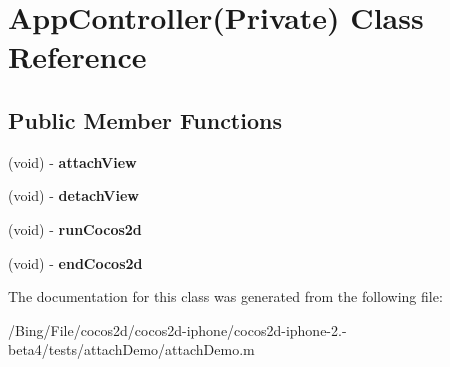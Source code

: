 \hypertarget{interface_app_controller_07_private_08}{\section{App\-Controller(Private) Class Reference}
\label{interface_app_controller_07_private_08}
}
\subsection*{Public Member Functions}
\begin{DoxyCompactItemize}
\item 
\hypertarget{interface_app_controller_07_private_08_af3af8aba92d43780f0247f8ca91202b5}{(void) -\/ {\bfseries attach\-View}}\label{interface_app_controller_07_private_08_af3af8aba92d43780f0247f8ca91202b5}

\item 
\hypertarget{interface_app_controller_07_private_08_a17c3ab8ddbfc3f049a54f18b8e9f3048}{(void) -\/ {\bfseries detach\-View}}\label{interface_app_controller_07_private_08_a17c3ab8ddbfc3f049a54f18b8e9f3048}

\item 
\hypertarget{interface_app_controller_07_private_08_ae37f8246ee9e4e0d3125f302e06c6384}{(void) -\/ {\bfseries run\-Cocos2d}}\label{interface_app_controller_07_private_08_ae37f8246ee9e4e0d3125f302e06c6384}

\item 
\hypertarget{interface_app_controller_07_private_08_aac9cc4fa1687d8f75a0d5b930dc8d34e}{(void) -\/ {\bfseries end\-Cocos2d}}\label{interface_app_controller_07_private_08_aac9cc4fa1687d8f75a0d5b930dc8d34e}

\end{DoxyCompactItemize}


The documentation for this class was generated from the following file\-:\begin{DoxyCompactItemize}
\item 
/\-Bing/\-File/cocos2d/cocos2d-\/iphone/cocos2d-\/iphone-\/2.-\/beta4/tests/attach\-Demo/attach\-Demo.\-m\end{DoxyCompactItemize}
